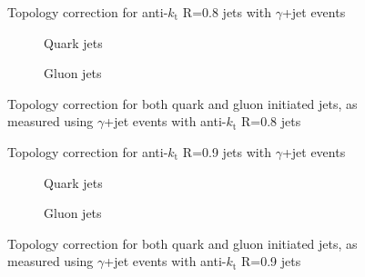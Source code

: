 \clearpage
\begin{figure}[!ht]
 \centering
 \caption[Topology correction for anti-$k_{\mathrm t}$ R=0.8 jets with $\gamma$+jet events]
 {\small Topology correction for anti-$k_{\mathrm t}$ R=0.8 jets with $\gamma$+jet events}
 \label{plot:GJetTopoCorr8App}
\end{figure}

\begin{figure}[!ht]
 \centering
 \begin{subfigure}{.5\textwidth}
  \centering
  \caption{Quark jets}
 \end{subfigure}%
 \begin{subfigure}{.5\textwidth}
  \centering
  \caption{Gluon jets}
 \end{subfigure}
 \caption[Quark/gluon jet topology correction, anti-$k_{\mathrm t}$ R=0.8, $\gamma$+jet]
 {\small Topology correction for both quark and gluon initiated jets, as measured using $\gamma$+jet events with anti-$k_{\mathrm t}$ R=0.8 jets}
 \label{plot:GJetTopoCorrFlav8App}
\end{figure}

\clearpage
\begin{figure}[!ht]
 \centering
 \caption[Topology correction for anti-$k_{\mathrm t}$ R=0.9 jets with $\gamma$+jet events]
 {\small Topology correction for anti-$k_{\mathrm t}$ R=0.9 jets with $\gamma$+jet events}
 \label{plot:GJetTopoCorr9App}
\end{figure}

\begin{figure}[!ht]
 \centering
 \begin{subfigure}{.5\textwidth}
  \centering
  \caption{Quark jets}
 \end{subfigure}%
 \begin{subfigure}{.5\textwidth}
  \centering
  \caption{Gluon jets}
 \end{subfigure}
 \caption[Quark/gluon jet topology correction, anti-$k_{\mathrm t}$ R=0.9, $\gamma$+jet]
 {\small Topology correction for both quark and gluon initiated jets, as measured using $\gamma$+jet events with anti-$k_{\mathrm t}$ R=0.9 jets}
 \label{plot:GJetTopoCorrFlav9App}
\end{figure}

